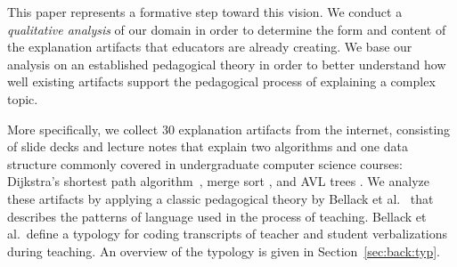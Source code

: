 \documentclass[conference]{IEEEtran}
\begin{document}
This paper represents a formative step toward this vision. We conduct a
\emph{qualitative analysis} of our domain in order to determine the form and
content of the explanation artifacts that educators are already creating.
%
We base our analysis on an established pedagogical theory in order to better
understand how well existing artifacts support the pedagogical process of
explaining a complex topic.


More specifically, we collect 30 explanation artifacts from the internet,
consisting of slide decks and lecture notes that explain two algorithms and one
data structure commonly covered in undergraduate computer science courses:
Dijkstra's shortest path algorithm~\cite[pp.~137--142]{KT05}, merge sort
\cite[210--214]{KT05}, and AVL trees \cite[?]{?}.
%
We analyze these artifacts by applying a classic pedagogical theory by Bellack
et al.~\cite{bellack1966language} that describes the patterns of language used
in the process of teaching. Bellack et al.\ define a typology for coding
transcripts of teacher and student verbalizations during teaching. An overview
of the typology is given in Section~\ref{sec:back:typ}.
\end{document}

